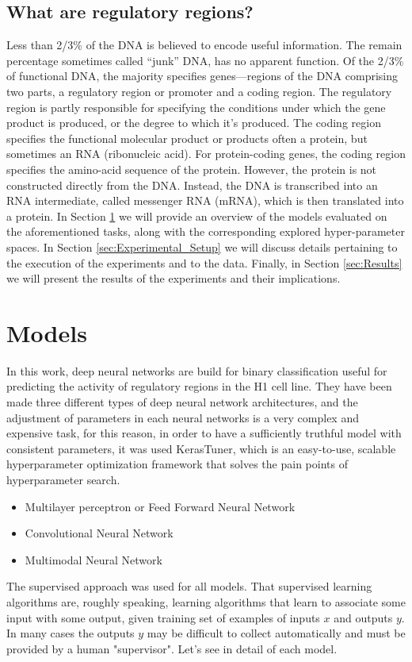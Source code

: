 \documentclass{article}
\begin{document}
\subsection{What are regulatory regions?}
Less than 2/3\% of the DNA is believed to encode useful information. The remain percentage sometimes called “junk” DNA, has no apparent function. Of the 2/3\% of functional DNA, the majority specifies genes—regions of the DNA comprising two parts, a regulatory region or promoter and a coding region.
The regulatory region is partly responsible for specifying the conditions under which the gene product is produced, or the degree to which it's produced. The coding region specifies the functional molecular product or products often a protein, but sometimes an RNA (ribonucleic acid). For protein-coding genes, the coding region specifies the amino-acid sequence of the protein. However, the protein is not constructed directly from the DNA. Instead, the DNA is transcribed into an RNA intermediate, called messenger RNA (mRNA), which is then translated into a protein. 
\newline
\newline
\noindent
In Section \ref{sec:Models} we will provide an overview of the models evaluated on the aforementioned tasks, along with the corresponding explored hyper-parameter spaces. In Section \ref{sec:Experimental_Setup} we will discuss details pertaining to the execution of the experiments and to the data. Finally, in Section \ref{sec:Results} we will present the results of the experiments and their implications.

\section{Models}
\label{sec:Models}
In this work, deep neural networks are build for binary classification useful for predicting the activity of regulatory regions in the H1 cell line. They have been made three different types of deep neural network architectures, and the adjustment of parameters in each neural networks is a very complex and expensive task, for this reason, in order to have a sufficiently truthful model with consistent parameters, it was used KerasTuner, which is an easy-to-use, scalable hyperparameter optimization framework that solves the pain points of hyperparameter search.
\begin{itemize}
  \item Multilayer perceptron or Feed Forward Neural Network
  \item Convolutional Neural Network 
  \item Multimodal Neural Network
\end{itemize}
The supervised approach was used for all models. That supervised learning algorithms are, roughly speaking, learning algorithms that learn to associate some input with some output, given training set of examples of inputs $x$ and outputs $y$. In many cases the outputs $y$ may be difficult to collect automatically and must be provided by a human "supervisor". Let's see in detail of each model.
\end{document}
